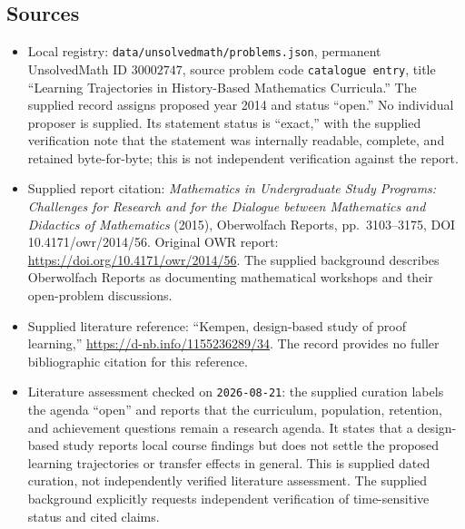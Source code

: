 \documentclass[11pt]{article}
\begin{document}
\subsection{Sources}
\begin{itemize}
\item Local registry: \texttt{data/unsolvedmath/problems.json}, permanent UnsolvedMath ID \(30002747\), source problem code \texttt{catalogue entry}, title ``Learning Trajectories in History-Based Mathematics Curricula.'' The supplied record assigns proposed year 2014 and status ``open.'' No individual proposer is supplied. Its statement status is ``exact,'' with the supplied verification note that the statement was internally readable, complete, and retained byte-for-byte; this is not independent verification against the report.
\item Supplied report citation: \emph{Mathematics in Undergraduate Study Programs: Challenges for Research and for the Dialogue between Mathematics and Didactics of Mathematics} (2015), Oberwolfach Reports, pp.\ 3103--3175, DOI 10.4171/owr/2014/56. Original OWR report: \url{https://doi.org/10.4171/owr/2014/56}. The supplied background describes Oberwolfach Reports as documenting mathematical workshops and their open-problem discussions.
\item Supplied literature reference: ``Kempen, design-based study of proof learning,'' \url{https://d-nb.info/1155236289/34}. The record provides no fuller bibliographic citation for this reference.
\item Literature assessment checked on \texttt{2026-08-21}: the supplied curation labels the agenda ``open'' and reports that the curriculum, population, retention, and achievement questions remain a research agenda. It states that a design-based study reports local course findings but does not settle the proposed learning trajectories or transfer effects in general. This is supplied dated curation, not independently verified literature assessment. The supplied background explicitly requests independent verification of time-sensitive status and cited claims.
\end{itemize}
\end{document}
